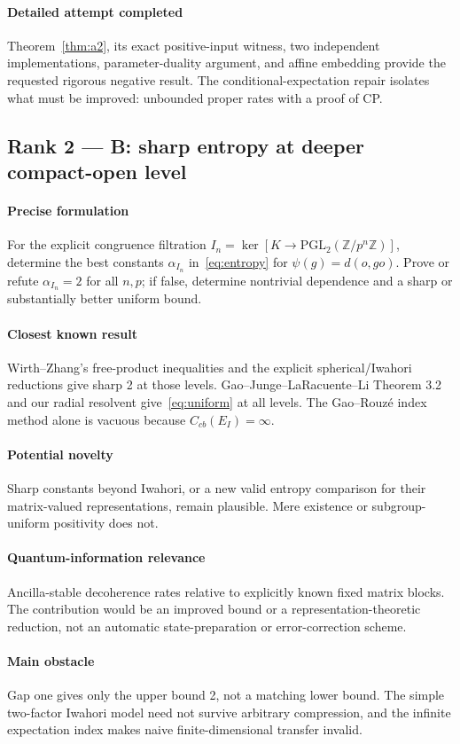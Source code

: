 \documentclass[11pt]{article}
\theoremstyle{remark}\newtheorem{remark}[definition]{Remark}
\newcommand{\Z}{\mathbb{Z}}
\begin{document}
\paragraph{Detailed attempt completed} Theorem~\ref{thm:a2}, its exact
positive-input witness, two independent implementations, parameter-duality
argument, and affine embedding provide the requested rigorous negative
result. The conditional-expectation repair isolates what must be improved:
unbounded proper rates with a proof of CP.

\subsection{Rank 2 --- B: sharp entropy at deeper compact-open level}
\paragraph{Precise formulation} For the explicit congruence filtration
$I_n=\ker[K\to\mathrm{PGL}_2(\Z/p^n\Z)]$, determine the best constants
$\alpha_{I_n}$ in~\eqref{eq:entropy} for $\psi(g)=d(o,go)$.
Prove or refute $\alpha_{I_n}=2$ for all $n,p$; if false, determine
nontrivial dependence and a sharp or substantially better uniform bound.
\paragraph{Closest known result} Wirth--Zhang's free-product inequalities
and the explicit spherical/Iwahori reductions give sharp 2 at those
levels. Gao--Junge--LaRacuente--Li Theorem 3.2 and our radial resolvent
give~\eqref{eq:uniform} at all levels. The Gao--Rouz\'e index method alone
is vacuous because $C_{cb}(E_I)=\infty$.
\paragraph{Potential novelty} Sharp constants beyond Iwahori, or a new
valid entropy comparison for their matrix-valued representations, remain
plausible. Mere existence or subgroup-uniform positivity does not.
\paragraph{Quantum-information relevance} Ancilla-stable decoherence
rates relative to explicitly known fixed matrix blocks. The contribution
would be an improved bound or a representation-theoretic reduction,
not an automatic state-preparation or error-correction scheme.
\paragraph{Main obstacle} Gap one gives only the upper bound 2, not a
matching lower bound. The simple two-factor Iwahori model need not survive
arbitrary compression, and the infinite expectation index makes naive
finite-dimensional transfer invalid.
\end{document}
